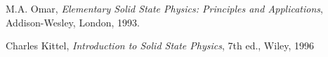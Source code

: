 \begin{thebibliography}{9}
    M.A. Omar, \textit{Elementary Solid State Physics:  
    Principles and Applications}, 
    Addison-Wesley, London, 1993.
    
    Charles Kittel, \textit{Introduction to Solid State Physics}, 7th ed.,
    Wiley, 1996

\end{thebibliography}